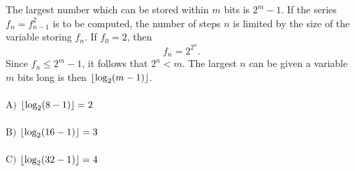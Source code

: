 \documentclass[aps,12pt,nobalancelastpage,amsmath,amssymb,
nofootinbib]{revtex4}
\DeclarePairedDelimiter\floor{\lfloor}{\rfloor}
\begin{document}
The largest number which can be stored within $m$ bits is $2^{m}-1$. If the series $f_{n}=f^{2}_{n-1}$ is to be computed, the number of steps $n$ is limited by the size of the variable storing $f_{n}$. If $f_{0}=2$, then
\begin{equation}
f_{n}=2^{2^{n}}.
\end{equation}
Since $f_{n}\leq 2^{m}-1$, it follows that $2^{n}<m$. The largest $n$ can be given a variable $m$ bits long is then $\floor{\text{log}_{2}(m-1)}$.\\\\
A$)$ $\floor{\text{log}_{2}(8-1)}=2$\\\\
B$)$ $\floor{\text{log}_{2}(16-1)}=3$\\\\
C$)$ $\floor{\text{log}_{2}(32-1)}=4$
\end{document}
